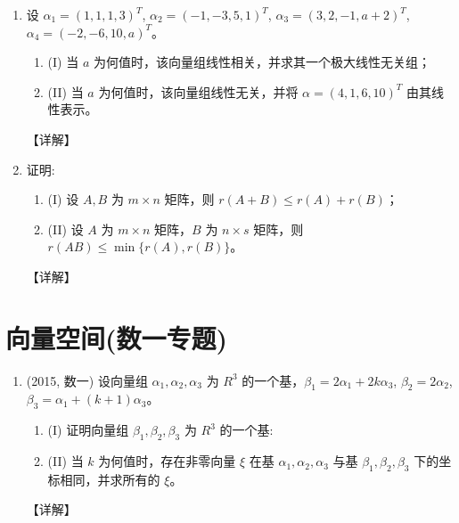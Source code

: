 \documentclass[12pt, a4paper, oneside, UTF8]{ctexbook}
\begin{document}
\begin{enumerate}[label=\arabic*.,start=6]
    \item 设 $\alpha_1 = (1,1,1,3)^T$, $\alpha_2 = (-1,-3,5,1)^T$, $\alpha_3 = (3,2,-1, a+2)^T$, $\alpha_4 = (-2,-6,10, a)^T$。
    \begin{enumerate}
        \item (I) 当 $a$ 为何值时，该向量组线性相关，并求其一个极大线性无关组；
        \item (II) 当 $a$ 为何值时，该向量组线性无关，并将 $\alpha = (4,1,6,10)^T$ 由其线性表示。
    \end{enumerate}
    
    \begin{solution}
    【详解】
    \end{solution}
    
    \item 证明:
    \begin{enumerate}
        \item (I) 设 $A, B$ 为 $m \times n$ 矩阵，则 $r(A+B) \leq r(A) + r(B)$；
        \item (II) 设 $A$ 为 $m \times n$ 矩阵，$B$ 为 $n \times s$ 矩阵，则 $r(AB) \leq \min\{r(A), r(B)\}$。
    \end{enumerate}
    
    \begin{solution}
    【详解】
    \end{solution}
\end{enumerate}

\section{向量空间(数一专题)}

\begin{enumerate}[label=\arabic*.,start=8]
    \item (2015, 数一) 设向量组 $\alpha_1, \alpha_2, \alpha_3$ 为 $R^3$ 的一个基，$\beta_1 = 2\alpha_1 + 2k\alpha_3$, $\beta_2 = 2\alpha_2$,
    $\beta_3 = \alpha_1 + (k+1)\alpha_3$。
    \begin{enumerate}
        \item (I) 证明向量组 $\beta_1, \beta_2, \beta_3$ 为 $R^3$ 的一个基:
        \item (II) 当 $k$ 为何值时，存在非零向量 $\xi$ 在基 $\alpha_1, \alpha_2, \alpha_3$ 与基 $\beta_1, \beta_2, \beta_3$ 下的坐标相同，并求所有的 $\xi$。
    \end{enumerate}
    
    \begin{solution}
    【详解】
    \end{solution}
\end{enumerate}

\ifx\allfiles\undefined
\end{document}
